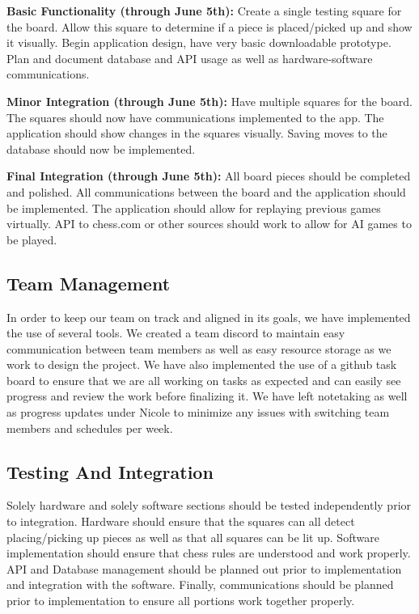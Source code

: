 \documentclass[11pt,journal]{IEEEtran}
\begin{document}
\textbf{Basic Functionality (through June 5th):} Create a single testing square for the board. Allow this square to determine if a piece is placed/picked up and show it visually. Begin application design, have very basic downloadable prototype. Plan and document database and API usage as well as hardware-software communications.

\textbf{Minor Integration (through June 5th):} Have multiple squares for the board. The squares should now have communications implemented to the app. The application should show changes in the squares visually. Saving moves to the database should now be implemented.

\textbf{Final Integration (through June 5th):} All board pieces should be completed and polished. All communications between the board and the application should be implemented. The application should allow for replaying previous games virtually. API to chess.com or other sources should work to allow for AI games to be played. 

\subsection{Team Management}
In order to keep our team on track and aligned in its goals, we have implemented the use of several tools. We created a team discord to maintain easy communication between team members as well as easy resource storage as we work to design the project. We have also implemented the use of a github task board to ensure that we are all working on tasks as expected and can easily see progress and review the work before finalizing it. We have left notetaking as well as progress updates under Nicole to minimize any issues with switching team members and schedules per week.

\subsection{Testing And Integration}
Solely hardware and solely software sections should be tested independently prior to integration. Hardware should ensure that the squares can all detect placing/picking up pieces as well as that all squares can be lit up. Software implementation should ensure that chess rules are understood and work properly. API and Database management should be planned out prior to implementation and integration with the software. Finally, communications should be planned prior to implementation to ensure all portions work together properly. 
\end{document}
